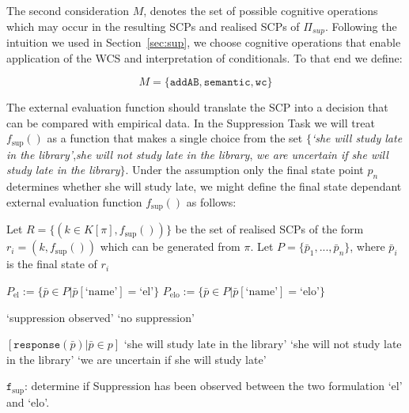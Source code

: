 The second consideration $M$, denotes the set of possible cognitive operations which may occur in the resulting SCPs and realised SCPs of $\Pi_{sup}$. Following the intuition we used in Section~\ref{sec:sup}, we choose cognitive operations that enable application of the WCS and interpretation of conditionals. To that end we define:

\[
M=\{\texttt{addAB}, \texttt{semantic}, \texttt{wc}\}
\]

The external evaluation function should translate the SCP into a decision that can be compared with empirical data. In the Suppression Task we will treat $f_\text{sup}()$ as a function that makes a single choice from the set $\{$\textit{`she will study late in the library'},\textit{she will not study late in the library}, \textit{we are uncertain if she will study late in the library}$\}$. Under the assumption only the final state point $p_n$ determines whether she will study late, we might define the final state dependant external evaluation function $f_\text{sup}()$ as follows:

\begin{algorithm}[H] 
\SetAlgoLined
{}
{
Let $R=\{(k\in K[\pi],f_\text{sup}())\}$ be the set of realised SCPs of the form $r_i=(k,f_\text{sup}())$ which can be generated from $\pi$.\;
Let $P=\{\bar{p}_1,...,\bar{p}_n\}$, where $\bar{p}_i$ is the final state of $r_i$\;

$P_\text{el}:=\{\bar{p} \in P | \bar{p}[\text{`name'}]=\text{`el'}\}$\;
$P_\text{elo}:=\{\bar{p} \in P | \bar{p}[\text{`name'}]=\text{`elo'}\}$\;

{
\Return  `suppression observed'
}
\Else
{
\Return  `no suppression'
}
}
{
\Return $[\texttt{response}(\bar{p}) | \bar{p} \in p]$
}
{
{
\Return `she will study late in the library'
}
{
\Return `she will not study late in the library'
}
\Else
{
\Return `we are uncertain if she will study late'
}
}

\caption{$\texttt{f}_\text{sup}$: determine if Suppression has been observed between the two formulation `el' and `elo'.}
\label{evaluation:f_sup}
\end{algorithm}

